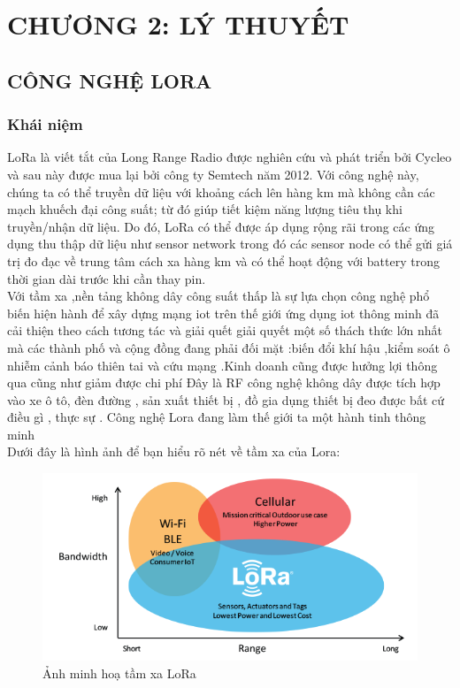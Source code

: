 \section*{CHƯƠNG 2: LÝ THUYẾT}
\setcounter{section}{2}
\setcounter{subsection}{0}
\subsection{CÔNG NGHỆ LORA}
\subsubsection{Khái niệm}
LoRa là viết tắt của Long Range Radio được nghiên cứu và phát triển bởi Cycleo và sau này được mua lại bởi công ty Semtech năm 2012. Với công nghệ này, chúng ta có thể truyền dữ liệu với khoảng cách lên hàng km mà không cần các mạch khuếch đại công suất; từ đó giúp tiết kiệm năng lượng tiêu thụ khi truyền/nhận dữ liệu. Do đó, LoRa có thể được áp dụng rộng rãi trong các ứng dụng thu thập dữ liệu như sensor network trong đó các sensor node có thể gửi giá trị đo đạc về trung tâm cách xa hàng km và có thể hoạt động với battery trong thời gian dài trước khi cần thay pin.\\
\indent Với tầm xa ,nền tảng không dây công suất thấp là sự lựa chọn công nghệ phổ biến hiện hành để xây dựng mạng iot trên thế giới ứng dụng iot thông minh đã cải thiện theo cách tương tác và giải quết giải quyết một số thách thức lớn nhất mà các thành phố và cộng đồng đang phải đối mặt :biến đổi khí hậu ,kiểm soát ô nhiễm cảnh báo thiên tai và cứu mạng .Kinh doanh cũng được hưởng lợi thông qua cũng như giảm được chi phí
Đây là RF công nghệ không dây được tích hợp vào xe ô tô, đèn đường , sản xuất thiết bị , đồ gia dụng thiết bị đeo được bất cứ điều gì , thực sự . Công nghệ Lora đang làm thế giới ta một hành tinh thông minh\\
\indent Dưới đây là hình ảnh để bạn hiểu rõ nét về tầm xa của Lora:
\begin{figure}[H]
	\centering
	\includegraphics[scale=.5]{Chapter 2/image chapter 2/tamxaLoRa.png}
	\caption[Ảnh minh hoạ tầm xa LoRa]{Ảnh minh hoạ tầm xa LoRa}
	\label{hinh21}
\end{figure}
